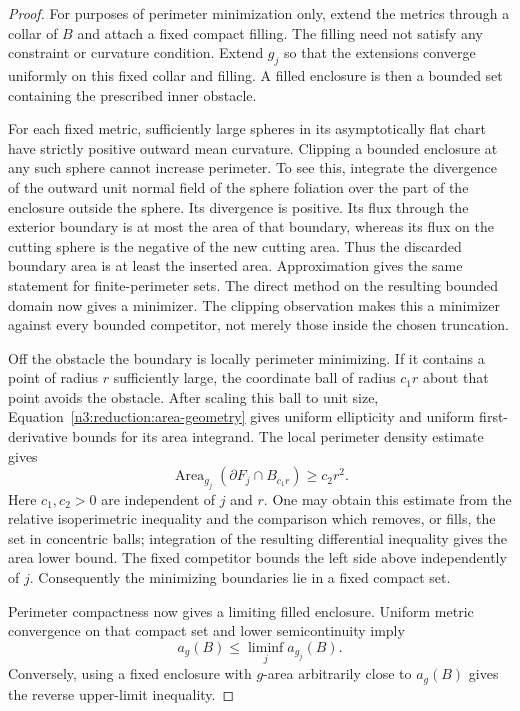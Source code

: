 \begin{proof}
For purposes of perimeter minimization only, extend the metrics through
a collar of $B$ and attach a fixed compact filling.  The filling need not
satisfy any constraint or curvature condition.  Extend $g_j$ so that the
extensions converge uniformly on this fixed collar and filling.  A filled
enclosure is then a bounded set containing the prescribed inner obstacle.

For each fixed metric, sufficiently large spheres in its asymptotically
flat chart have strictly positive outward mean curvature.  Clipping a
bounded enclosure at any such sphere cannot increase perimeter.  To see
this, integrate the divergence of the outward unit normal field of the
sphere foliation over the part of the enclosure outside the sphere.  Its
divergence is positive.  Its flux through the exterior boundary is at
most the area of that boundary, whereas its flux on the cutting sphere
is the negative of the new cutting area.  Thus the discarded boundary
area is at least the inserted area.  Approximation gives the same
statement for finite-perimeter sets.  The direct method on the resulting
bounded domain now gives a minimizer.  The clipping observation makes
this a minimizer against every bounded competitor, not merely those
inside the chosen truncation.

Off the obstacle the boundary is locally perimeter minimizing.  If it
contains a point of radius $r$ sufficiently large, the coordinate ball
of radius $c_1r$ about that point avoids the obstacle.  After scaling
this ball to unit size, Equation~\eqref{n3:reduction:area-geometry} gives
uniform ellipticity and uniform first-derivative bounds for its area
integrand.  The local perimeter density estimate gives
\[
 \operatorname{Area}_{g_j}
       (\partial F_j\cap B_{c_1r})\ge c_2r^2.
\]
Here $c_1,c_2>0$ are independent of $j$ and $r$.  One may obtain this
estimate from the relative isoperimetric inequality and the comparison
which removes, or fills, the set in concentric balls; integration of the
resulting differential inequality gives the area lower bound.  The
fixed competitor bounds the left side above independently of $j$.
Consequently the minimizing boundaries lie in a fixed compact set.

Perimeter compactness now gives a limiting filled enclosure.  Uniform
metric convergence on that compact set and lower semicontinuity imply
\[
 a_g(B)\le\liminf_j a_{g_j}(B).
\]
Conversely, using a fixed enclosure with $g$-area arbitrarily close to
$a_g(B)$ gives the reverse upper-limit inequality.


\end{proof}
